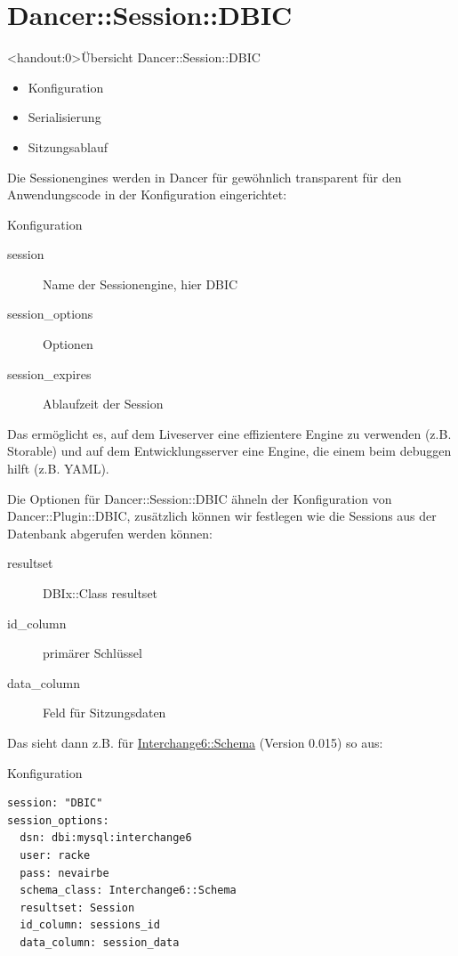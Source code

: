 \section{Dancer::Session::DBIC}

\begin{frame}<handout:0>{Übersicht Dancer::Session::DBIC}
\begin{itemize}
\item Konfiguration
\item Serialisierung
\item Sitzungsablauf
\end{itemize}
\end{frame}

Die Sessionengines werden in Dancer für gewöhnlich transparent
für den Anwendungscode in der Konfiguration eingerichtet:

\begin{frame}{Konfiguration}
\begin{description}
\item[session] Name der Sessionengine, hier DBIC
\item[session\_options] Optionen
\item[session\_expires] Ablaufzeit der Session
\end{description}
\end{frame}

Das ermöglicht es, auf dem Liveserver eine effizientere Engine
zu verwenden (z.B. Storable) und auf dem Entwicklungsserver
eine Engine, die einem beim debuggen hilft (z.B. YAML).

Die Optionen für Dancer::Session::DBIC ähneln der Konfiguration von
Dancer::Plugin::DBIC, zusätzlich können wir festlegen wie
die Sessions aus der Datenbank abgerufen werden können:

\begin{description}
\item[resultset] DBIx::Class resultset
\item[id\_column] primärer Schlüssel
\item[data\_column] Feld für Sitzungsdaten 
\end{description}

Das sieht dann z.B. für \href{https://metacpan.org/pod/Interchange6::Schema}{Interchange6::Schema} (Version 0.015) so aus:

\begin{frame}[fragile]{Konfiguration}
\begin{lstlisting}
session: "DBIC"
session_options:
  dsn: dbi:mysql:interchange6
  user: racke
  pass: nevairbe
  schema_class: Interchange6::Schema
  resultset: Session
  id_column: sessions_id
  data_column: session_data
\end{lstlisting}
\end{frame}

